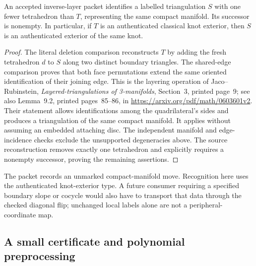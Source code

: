 \begin{proposition}
\label{prop:boundary-unlayer-sound}
An accepted inverse-layer packet identifies a labelled triangulation
$S$ with one fewer tetrahedron than $T$, representing the same compact
manifold.  Its successor is nonempty.  In particular, if $T$ is an
authenticated classical knot exterior, then $S$ is an authenticated
exterior of the same knot.
\end{proposition}
\begin{proof}
The literal deletion comparison reconstructs $T$ by adding the fresh
tetrahedron $d$ to $S$ along two distinct boundary triangles.  The
shared-edge comparison proves that both face permutations extend the
same oriented identification of their joining edge.  This is the
layering operation of Jaco--Rubinstein, \emph{Layered-triangulations of
3-manifolds}, Section~3, printed page~9; see also Lemma~9.2, printed
pages~85--86, in
\url{https://arxiv.org/pdf/math/0603601v2}.
Their statement allows identifications among the quadrilateral's sides
and produces a triangulation of the same compact manifold.  It applies
without assuming an embedded attaching disc.  The independent manifold
and edge-incidence checks exclude the unsupported degeneracies above.
The source reconstruction removes exactly one tetrahedron and explicitly
requires a nonempty successor, proving the remaining assertions.
\end{proof}

The packet records an unmarked compact-manifold move.  Recognition here
uses the authenticated knot-exterior type.  A future consumer requiring
a specified boundary slope or cocycle would also have to transport that
data through the checked diagonal flip; unchanged local labels alone
are not a peripheral-coordinate map.

\subsection{A small certificate and polynomial preprocessing}

